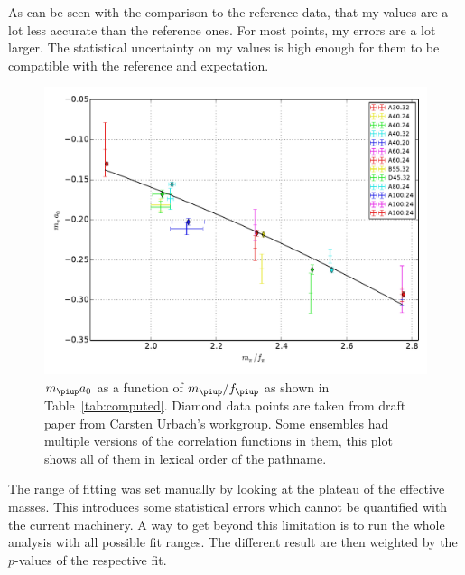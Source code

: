 \documentclass[11pt, english, fleqn, DIV=10, headinclude]{scrartcl}
\newcommand\mpi{m_{\piup}}
\begin{document}
As can be seen with the comparison to the reference data, that my values are a
lot less accurate than the reference ones. For most points, my errors are a lot
larger. The statistical uncertainty on my values is high enough for them to be
compatible with the reference and expectation.

\begin{figure}[htbp]
    \centering
    \includegraphics[width=\linewidth]{plots/result.pdf}
    \caption{%
        $\mpi a_0$ as a function of $\mpi/f_\piup$ as shown in
        Table~\ref{tab:computed}. Diamond data points are taken from draft
        paper from Carsten Urbach's workgroup. Some ensembles had multiple
        versions of the correlation functions in them, this plot shows all of
        them in lexical order of the pathname.
    }
    \label{fig:result}
\end{figure}

The range of fitting was set manually by looking at the plateau of the
effective masses. This introduces some statistical errors which cannot be
quantified with the current machinery. A way to get beyond this limitation is
to run the whole analysis with all possible fit ranges. The different result
are then weighted by the $p$-values of the respective fit.

\clearpage
\end{document}
